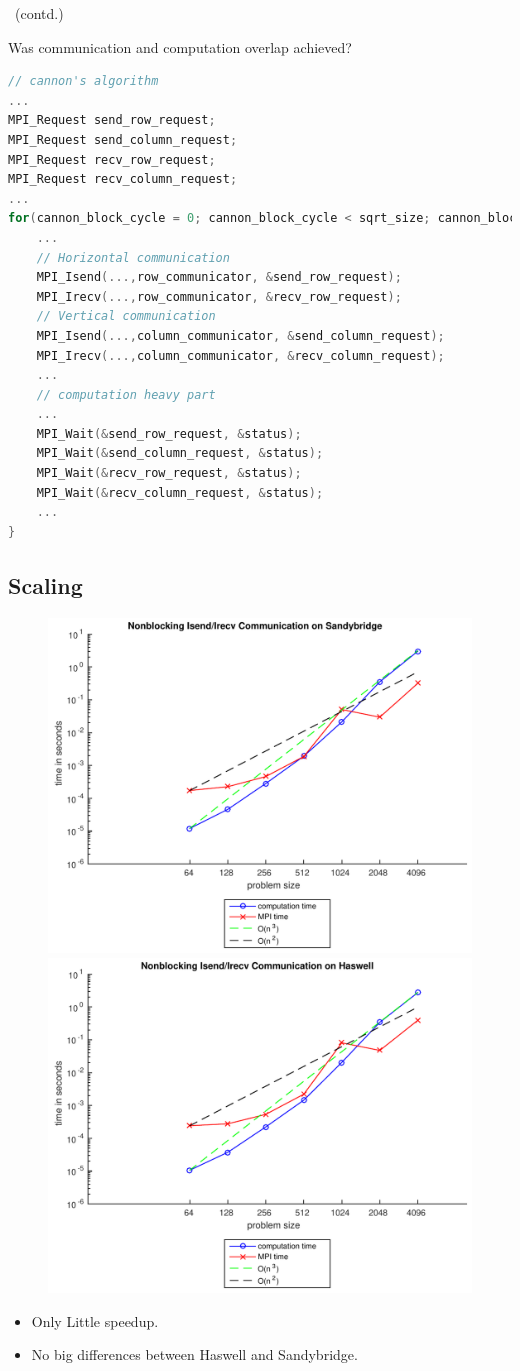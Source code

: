 \documentclass[9pt,pdftex]{beamer}
\begin{document}
\begin{frame}[fragile]{\insertsubsection \ (contd.)}
\begin{block}{Was communication and computation overlap achieved?}
\begin{lstlisting}[language=C, basicstyle=\scriptsize, keepspaces=true, columns=flexible]
// cannon's algorithm
...
MPI_Request send_row_request;
MPI_Request send_column_request;
MPI_Request recv_row_request;
MPI_Request recv_column_request;
...
for(cannon_block_cycle = 0; cannon_block_cycle < sqrt_size; cannon_block_cycle++){
    ...
    // Horizontal communication
    MPI_Isend(...,row_communicator, &send_row_request);		
    MPI_Irecv(...,row_communicator, &recv_row_request);
    // Vertical communication
    MPI_Isend(...,column_communicator, &send_column_request);
    MPI_Irecv(...,column_communicator, &recv_column_request);
    ...		
    // computation heavy part 
    ...		
    MPI_Wait(&send_row_request, &status);
    MPI_Wait(&send_column_request, &status);
    MPI_Wait(&recv_row_request, &status);
    MPI_Wait(&recv_column_request, &status);
    ...		
}
\end{lstlisting}
\end{block}
\end{frame}

\subsection{Scaling}
\begin{frame}{\insertsubsection}
\begin{figure}
\includegraphics[width=.5\textwidth]{Pictures/Task4SB}
\hfill
\includegraphics[width=.5\textwidth]{Pictures/Task4HW}
\end{figure}
\begin{itemize}
\item Only Little speedup.
\item No big differences between Haswell and Sandybridge.
\end{itemize}
\end{frame}
\end{document}
